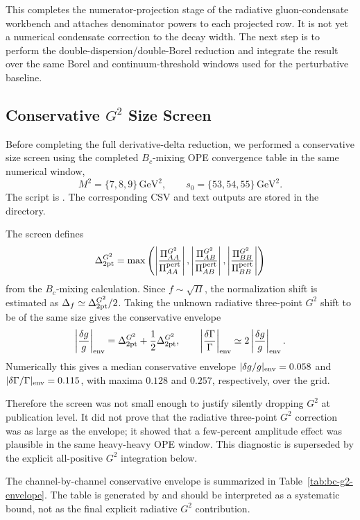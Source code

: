 \documentclass[11pt]{article}
\newcommand{\GeV}{\mathrm{GeV}}
\begin{document}
This completes the numerator-projection stage of the radiative
gluon-condensate workbench and attaches denominator powers to each projected
row.  It is not yet a numerical condensate correction to the decay width.  The
next step is to perform the double-dispersion/double-Borel reduction and
integrate the result over the same Borel and continuum-threshold windows used
for the perturbative baseline.

\subsection*{Conservative \(G^2\) Size Screen}

Before completing the full derivative-delta reduction, we performed a
conservative size screen using the completed \(B_c\)-mixing OPE convergence
table in the same numerical window,
\[
M^2=\{7,8,9\}\,\GeV^2,\qquad
s_0=\{53,54,55\}\,\GeV^2 .
\]
The script is .  The corresponding CSV
and text outputs are stored in the  directory.

The screen defines
\[
\Delta_{\rm 2pt}^{G^2}=
\max\left(
\left|\frac{\Pi_{AA}^{G^2}}{\Pi_{AA}^{\rm pert}}\right|,
\left|\frac{\Pi_{AB}^{G^2}}{\Pi_{AB}^{\rm pert}}\right|,
\left|\frac{\Pi_{BB}^{G^2}}{\Pi_{BB}^{\rm pert}}\right|
\right)
\]
from the \(B_c\)-mixing calculation.  Since \(f\sim\sqrt{\Pi}\), the
normalization shift is estimated as
\(\Delta_f\simeq \Delta_{\rm 2pt}^{G^2}/2\).  Taking the unknown radiative
three-point \(G^2\) shift to be of the same size gives the conservative
envelope
\[
\left|\frac{\delta g}{g}\right|_{\rm env}
=\Delta_{\rm 2pt}^{G^2}+\frac{1}{2}\Delta_{\rm 2pt}^{G^2},
\qquad
\left|\frac{\delta\Gamma}{\Gamma}\right|_{\rm env}
\simeq 2\left|\frac{\delta g}{g}\right|_{\rm env}.
\]
Numerically this gives a median conservative envelope
\(|\delta g/g|_{\rm env}=0.058\) and
\(|\delta\Gamma/\Gamma|_{\rm env}=0.115\), with maxima \(0.128\) and \(0.257\),
respectively, over the grid.

Therefore the screen was not small enough to justify silently dropping
\(G^2\) at publication level.  It did not prove that the radiative
three-point \(G^2\) correction was as large as the envelope; it showed that a
few-percent amplitude effect was plausible in the same heavy-heavy OPE window.
This diagnostic is superseded by the explicit all-positive \(G^2\) integration
below.

The channel-by-channel conservative envelope is summarized in
Table~\ref{tab:bc-g2-envelope}.  The table is generated by
 and should be interpreted as a systematic
bound, not as the final explicit radiative \(G^2\) contribution.
\end{document}
